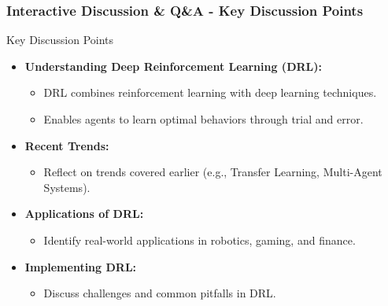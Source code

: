 \documentclass[aspectratio=169]{beamer}
\begin{document}
\begin{frame}[fragile]
  \frametitle{Interactive Discussion \& Q\&A - Key Discussion Points}
  \begin{block}{Key Discussion Points}
    \begin{itemize}
      \item \textbf{Understanding Deep Reinforcement Learning (DRL):}
      \begin{itemize}
        \item DRL combines reinforcement learning with deep learning techniques.
        \item Enables agents to learn optimal behaviors through trial and error.
      \end{itemize}
      \item \textbf{Recent Trends:}
      \begin{itemize}
        \item Reflect on trends covered earlier (e.g., Transfer Learning, Multi-Agent Systems).
      \end{itemize}
      \item \textbf{Applications of DRL:}
      \begin{itemize}
        \item Identify real-world applications in robotics, gaming, and finance.
      \end{itemize}
      \item \textbf{Implementing DRL:}
      \begin{itemize}
        \item Discuss challenges and common pitfalls in DRL.
      \end{itemize}
    \end{itemize}
  \end{block}
\end{frame}
\end{document}
